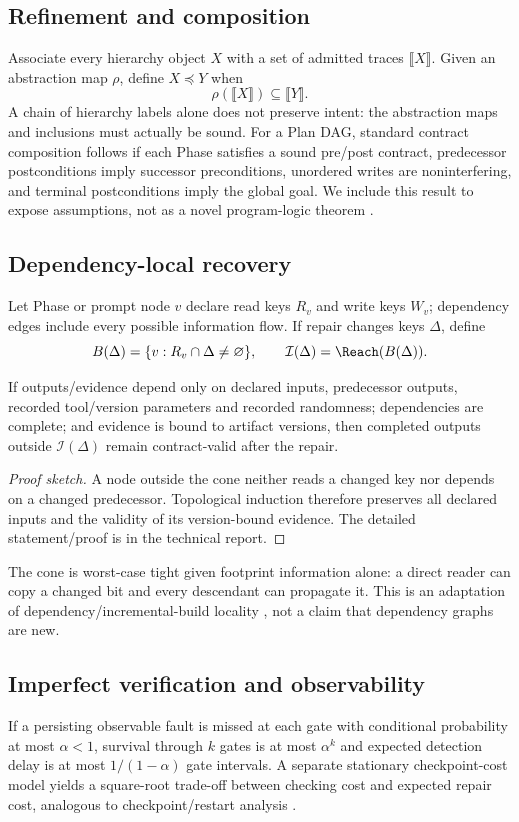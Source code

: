 \documentclass{article}
\begin{document}
\subsection{Refinement and composition}
Associate every hierarchy object $X$ with a set of admitted traces $\llbracket X\rrbracket$. Given an abstraction map $\rho$, define $X\preceq Y$ when
\[
\rho(\llbracket X\rrbracket)\subseteq\llbracket Y\rrbracket.
\]
A chain of hierarchy labels alone does not preserve intent: the abstraction maps and inclusions must actually be sound. For a Plan DAG, standard contract composition follows if each Phase satisfies a sound pre/post contract, predecessor postconditions imply successor preconditions, unordered writes are noninterfering, and terminal postconditions imply the global goal. We include this result to expose assumptions, not as a novel program-logic theorem \citep{hoare1969axiomatic}.

\subsection{Dependency-local recovery}
Let Phase or prompt node $v$ declare read keys $R_v$ and write keys $W_v$; dependency edges include every possible information flow. If repair changes keys $\Delta$, define
\[
B(\Delta)=\{v:R_v\cap\Delta\neq\varnothing\},\qquad
\mathcal I(\Delta)=\Reach(B(\Delta)).
\]
\begin{theorem}
If outputs/evidence depend only on declared inputs, predecessor outputs, recorded tool/version parameters and recorded randomness; dependencies are complete; and evidence is bound to artifact versions, then completed outputs outside $\mathcal I(\Delta)$ remain contract-valid after the repair.
\end{theorem}
\begin{proof}[Proof sketch]
A node outside the cone neither reads a changed key nor depends on a changed predecessor. Topological induction therefore preserves all declared inputs and the validity of its version-bound evidence. The detailed statement/proof is in the technical report.
\end{proof}
The cone is worst-case tight given footprint information alone: a direct reader can copy a changed bit and every descendant can propagate it. This is an adaptation of dependency/incremental-build locality \citep{mokhov2018build,acar2009selfadjusting}, not a claim that dependency graphs are new.

\subsection{Imperfect verification and observability}
If a persisting observable fault is missed at each gate with conditional probability at most $\alpha<1$, survival through $k$ gates is at most $\alpha^k$ and expected detection delay is at most $1/(1-\alpha)$ gate intervals. A separate stationary checkpoint-cost model yields a square-root trade-off between checking cost and expected repair cost, analogous to checkpoint/restart analysis \citep{young1974first,daly2006higher}.
\end{document}
